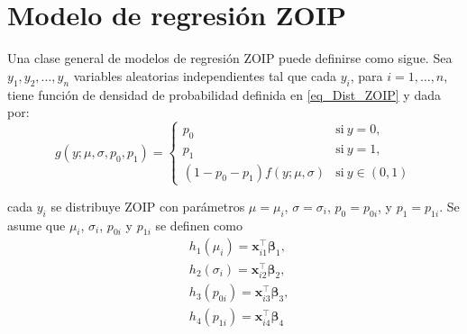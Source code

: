 \section{Modelo de regresi\'{o}n ZOIP}

Una clase general de modelos de regresi\'{o}n ZOIP puede definirse como sigue. Sea $y_1, y_2,\ldots, y_n$ variables aleatorias independientes tal que cada $y_i$, para $i=1,\ldots, n$, tiene funci\'{o}n de densidad de probabilidad definida en \eqref{eq_Dist_ZOIP} y dada por:
\begin{equation*}
g(y;\mu,\sigma, p_{0}, p_{1})=
\begin{cases}
p_{0} & \text{si}\ y=0,\\
p_{1} & \text{si}\ y=1,\\
(1-p_{0}-p_{1})f(y;\mu,\sigma) & \text{si}\ y \in (0,1)
\end{cases}
\end{equation*}

cada $y_i$ se distribuye ZOIP con par\'{a}metros $\mu = \mu_i$, $\sigma=\sigma_i$, $p_0=p_{0i}$, y $p_1=p_{1i}$. Se asume que $\mu_i$, $\sigma_i$, $p_{0i}$ y $p_{1i}$ se definen como
\begin{equation}
\begin{split}
&h_1(\mu_{i})=\mathbf{x}_{i1}^{\top} \boldsymbol{\beta}_1,\\
&h_2(\sigma_{i})=\mathbf{x}_{i2}^{\top} \boldsymbol{\beta}_2,\\
&h_3(p_{0i})=\mathbf{x}_{i3}^{\top} \boldsymbol{\beta}_3,\\
&h_4(p_{1i}) =\mathbf{x}_{i4}^{\top} \boldsymbol{\beta}_4
\end{split}
\label{eq_reg}
\end{equation}

